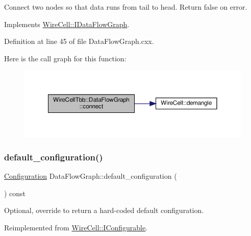 Connect two nodes so that data runs from tail to head. Return false on error. 

Implements \hyperlink{class_wire_cell_1_1_i_data_flow_graph_a6d065b2f080d956a17e7da4356aa31d9}{Wire\+Cell\+::\+I\+Data\+Flow\+Graph}.



Definition at line 45 of file Data\+Flow\+Graph.\+cxx.

Here is the call graph for this function\+:
\nopagebreak
\begin{figure}[H]
\begin{center}
\leavevmode
\includegraphics[width=350pt]{class_wire_cell_tbb_1_1_data_flow_graph_a37432ebdd10107bbcc99205893c2587b_cgraph}
\end{center}
\end{figure}
\mbox{\label{class_wire_cell_tbb_1_1_data_flow_graph_ae1dd804621d2e8f12456f40852f4db2e}} 
\subsubsection{\texorpdfstring{default\+\_\+configuration()}{default\_configuration()}}
{\footnotesize\ttfamily \hyperlink{namespace_wire_cell_a9f705541fc1d46c608b3d32c182333ee}{Configuration} Data\+Flow\+Graph\+::default\+\_\+configuration (\begin{DoxyParamCaption}{ }\end{DoxyParamCaption}) const\hspace{0.3cm}{\ttfamily [virtual]}}



Optional, override to return a hard-\/coded default configuration. 



Reimplemented from \hyperlink{class_wire_cell_1_1_i_configurable_a54841b2da3d1ea02189478bff96f7998}{Wire\+Cell\+::\+I\+Configurable}.



